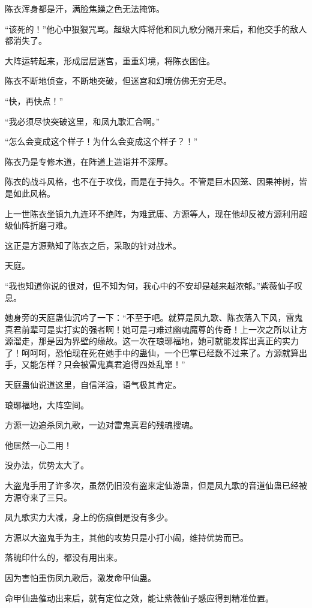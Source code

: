 \begin{this_body}
陈衣浑身都是汗，满脸焦躁之色无法掩饰。

“该死的！”他心中狠狠咒骂。超级大阵将他和凤九歌分隔开来后，和他交手的敌人都消失了。

大阵运转起来，形成层层迷宫，重重幻境，将陈衣困住。

陈衣不断地侦查，不断地突破，但迷宫和幻境仿佛无穷无尽。

“快，再快点！”

“我必须尽快突破这里，和凤九歌汇合啊。”

“怎么会变成这个样子！为什么会变成这个样子？！”

陈衣乃是专修木道，在阵道上造诣并不深厚。

陈衣的战斗风格，也不在于攻伐，而是在于持久。不管是巨木囚笼、因果神树，皆是如此风格。

上一世陈衣坐镇九九连环不绝阵，为难武庸、方源等人，现在他却反被方源利用超级仙阵折磨刁难。

这正是方源熟知了陈衣之后，采取的针对战术。

天庭。

“我也知道你说的很对，但不知为何，我心中的不安却是越来越浓郁。”紫薇仙子叹息。

她身旁的天庭蛊仙沉吟了一下：“不至于吧。就算是凤九歌、陈衣落入下风，雷鬼真君前辈可是实打实的强者啊！她可是刁难过幽魂魔尊的传奇！上一次之所以让方源溜走，那是因为界壁的缘故。这一次在琅琊福地，她可就能发挥出真正的实力了！呵呵呵，恐怕现在死在她手中的蛊仙，一个巴掌已经数不过来了。方源就算出手，又能怎样？只会被雷鬼真君追得四处乱窜！”

天庭蛊仙说道这里，自信洋溢，语气极其肯定。

琅琊福地，大阵空间。

方源一边追杀凤九歌，一边对雷鬼真君的残魂搜魂。

他居然一心二用！

没办法，优势太大了。

大盗鬼手用了许多次，虽然仍旧没有盗来定仙游蛊，但是凤九歌的音道仙蛊已经被方源夺来了三只。

凤九歌实力大减，身上的伤痕倒是没有多少。

方源以大盗鬼手为主，其他的攻势只是小打小闹，维持优势而已。

落魄印什么的，都没有用出来。

因为害怕重伤凤九歌后，激发命甲仙蛊。

命甲仙蛊催动出来后，就有定位之效，能让紫薇仙子感应得到精准位置。


\end{this_body}
